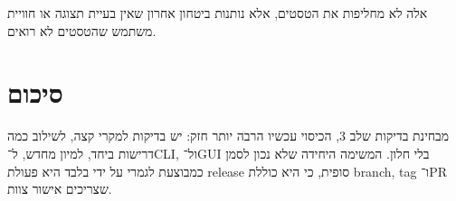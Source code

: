 \documentclass[12pt]{article}
\begin{document}
\begin{RTL}
אלה לא מחליפות את הטסטים, אלא נותנות ביטחון אחרון שאין בעיית תצוגה או חוויית משתמש שהטסטים לא רואים.

\section*{סיכום}
מבחינת בדיקות שלב 3, הכיסוי עכשיו הרבה יותר חזק: יש בדיקות למקרי קצה, לשילוב כמה דרישות ביחד, למיון מחדש, ל־CLI, ול־GUI בלי חלון. המשימה היחידה שלא נכון לסמן כמבוצעת לגמרי על ידי בלבד היא פעולת release סופית, כי היא כוללת branch, tag ו־PR שצריכים אישור צוות.

\end{RTL}
\end{document}
